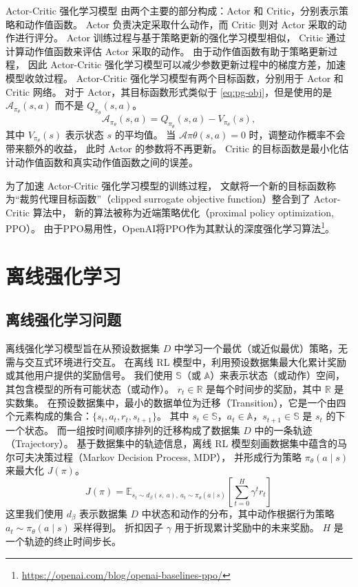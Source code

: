 Actor-Critic 强化学习模型 \cite{MBMGLHSK16} 由两个主要的部分构成：Actor 和 Critic，分别表示策略和动作值函数。
Actor 负责决定采取什么动作，而 Critic 则对 Actor 采取的动作进行评分。
Actor 训练过程与基于策略更新的强化学习模型相似，
Critic 通过计算动作值函数来评估 Actor 采取的动作。
由于动作值函数有助于策略更新过程，
因此 Actor-Critic 强化学习模型可以减少参数更新过程中的梯度方差，加速模型收敛过程。
Actor-Critic 强化学习模型有两个目标函数，分别用于 Actor 和 Critic 网络。
对于 Actor，其目标函数形式类似于 \autoref{eq:pg-obj}，但是使用的是 $\mathcal{A}_{\pi_{\theta}}(s, a)$ 而不是 $Q_{\pi_{\theta}}(s, a)$。
\begin{equation}
    \mathcal{A}_{\pi_{\theta}}(s, a)=Q_{\pi_{\theta}}(s, a)-V_{\pi_{\theta}}(s), 
\end{equation}
其中 $V_{\pi_{\theta}}(s)$ 表示状态 $s$ 的平均值。
当 $\mathcal{A}{\pi{\theta}}(s, a) = 0$ 时，调整动作概率不会带来额外的收益，
此时 Actor 的参数将不再更新。
Critic 的目标函数是最小化估计动作值函数和真实动作值函数之间的误差。

为了加速 Actor-Critic 强化学习模型的训练过程\cite{SLAJM15}，
文献{\rm\parencite{SWDRK17,HTSLMWTEWERS17}}将一个新的目标函数称为“裁剪代理目标函数”（clipped surrogate objective function）整合到了 Actor-Critic 算法中，
新的算法被称为近端策略优化（proximal policy optimization, PPO）。
由于PPO易用性，OpenAI将PPO作为其默认的深度强化学习算法\footnote{\url{https://openai.com/blog/openai-baselines-ppo/}}。


\section{离线强化学习}


\subsection{离线强化学习问题}
\label{sec:Offline Reinforcement Learning Problem}
离线强化学习模型旨在从预设数据集 $D$ 中学习一个最优（或近似最优）策略，无需与交互式环境进行交互。
在离线 RL 模型中，利用预设数据集最大化累计奖励或其他用户提供的奖励信号。
我们使用 $\mathbb{S}$（或 $\mathbb{A}$）来表示状态（或动作）空间，其包含模型的所有可能状态（或动作）。
$r_t \in \mathbb{R}$ 是每个时间步的奖励，其中 $\mathbb{R}$ 是实数集。
在预设数据集中，最小的数据单位为迁移（Transition），它是一个由四个元素构成的集合：$\{s_t, a_t, r_t, s_{t+1}\}$。
其中 $s_t \in \mathbb{S}$，$a_t \in \mathbb{A}$，$s_{t+1} \in \mathbb{S}$ 是 $s_t$ 的下一个状态。
而一组按时间顺序排列的迁移构成了数据集 $D$ 中的一条轨迹（Trajectory）。
基于数据集中的轨迹信息，离线 RL 模型刻画数据集中蕴含的马尔可夫决策过程（Markov Decision Process, MDP），
并形成行为策略 $\pi_\theta(a\mid{s})$ 来最大化 $J(\pi)$。
\begin{equation}
    J(\pi)=\mathbb{E}_{{s_t} \sim d_{\beta}({s,~a}),~{a_t} \sim \pi_\theta({a} \mid {s})}\left[\sum_{t=0}^{{H}} \gamma^{t} r_t\right]
\end{equation}
这里我们使用 $d_{\beta}$ 表示数据集 $D$ 中状态和动作的分布，其中动作根据行为策略 ${a_t}\sim \pi_\theta(a\mid{s})$ 采样得到。
折扣因子 $\gamma$ 用于折现累计奖励中的未来奖励。
$H$ 是一个轨迹的终止时间步长。

